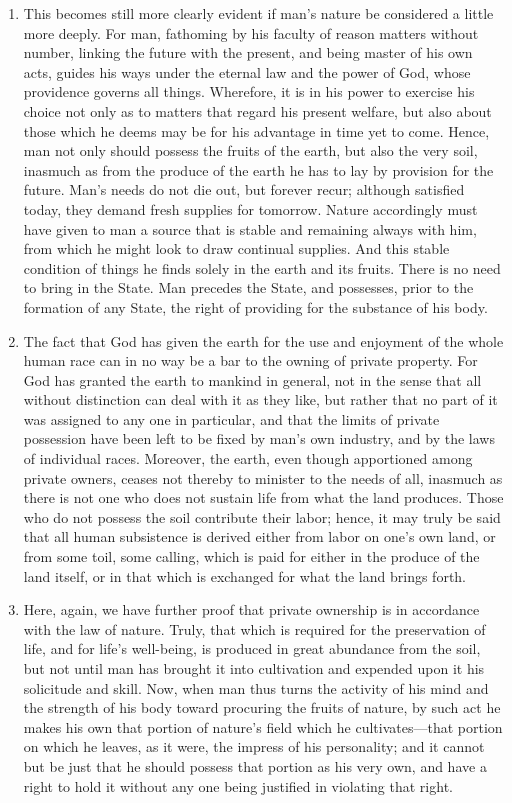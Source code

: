 \documentclass{book}
\begin{document}
\begin{enumerate}
	\item This becomes still more clearly evident if man’s nature be considered a little more deeply. For man, fathoming by his faculty of reason matters without number, linking the future with the present, and being master of his own acts, guides his ways under the eternal law and the power of God, whose providence governs all things. Wherefore, it is in his power to exercise his choice not only as to matters that regard his present welfare, but also about those which he deems may be for his advantage in time yet to come. Hence, man not only should possess the fruits of the earth, but also the very soil, inasmuch as from the produce of the earth he has to lay by provision for the future. Man’s needs do not die out, but forever recur; although satisfied today, they demand fresh supplies for tomorrow. Nature accordingly must have given to man a source that is stable and remaining always with him, from which he might look to draw continual supplies. And this stable condition of things he finds solely in the earth and its fruits. There is no need to bring in the State. Man precedes the State, and possesses, prior to the formation of any State, the right of providing for the substance of his body.


	\item The fact that God has given the earth for the use and enjoyment of the whole human race can in no way be a bar to the owning of private property. For God has granted the earth to mankind in general, not in the sense that all without distinction can deal with it as they like, but rather that no part of it was assigned to any one in particular, and that the limits of private possession have been left to be fixed by man’s own industry, and by the laws of individual races. Moreover, the earth, even though apportioned among private owners, ceases not thereby to minister to the needs of all, inasmuch as there is not one who does not sustain life from what the land produces. Those who do not possess the soil contribute their labor; hence, it may truly be said that all human subsistence is derived either from labor on one’s own land, or from some toil, some calling, which is paid for either in the produce of the land itself, or in that which is exchanged for what the land brings forth.


	\item Here, again, we have further proof that private ownership is in accordance with the law of nature. Truly, that which is required for the preservation of life, and for life’s well-being, is produced in great abundance from the soil, but not until man has brought it into cultivation and expended upon it his solicitude and skill. Now, when man thus turns the activity of his mind and the strength of his body toward procuring the fruits of nature, by such act he makes his own that portion of nature’s field which he cultivates—that portion on which he leaves, as it were, the impress of his personality; and it cannot but be just that he should possess that portion as his very own, and have a right to hold it without any one being justified in violating that right.



\end{enumerate}
\end{document}
